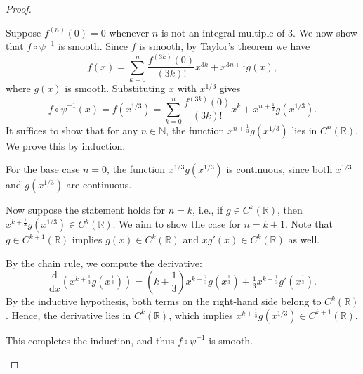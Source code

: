 \begin{problem}
\begin{proof}
\begin{enumerate}
            Suppose $f^{(n)}(0) = 0$ whenever $n$ is not an integral multiple of $3$. We now show that $f \circ \psi^{-1}$ is smooth. Since $f$ is smooth, by Taylor's theorem we have
            \[
            f(x) = \sum_{k=0}^{n} \frac{f^{(3k)}(0)}{(3k)!} x^{3k} + x^{3n+1} g(x),
            \]
            where $g(x)$ is smooth. Substituting $x$ with $x^{1/3}$ gives
            \[
            f \circ \psi^{-1}(x) = f(x^{1/3}) = \sum_{k=0}^{n} \frac{f^{(3k)}(0)}{(3k)!} x^{k} + x^{n + \frac{1}{3}} g(x^{1/3}).
            \]
            It suffices to show that for any $n \in \mathbb{N}$, the function $x^{n + \frac{1}{3}} g(x^{1/3})$ lies in $C^n(\mathbb{R})$. We prove this by induction.

            For the base case $n = 0$, the function $x^{1/3} g(x^{1/3})$ is continuous, since both $x^{1/3}$ and $g(x^{1/3})$ are continuous. 

            Now suppose the statement holds for $n = k$, i.e., if $g \in C^k(\mathbb{R})$, then $x^{k + \frac{1}{3}} g(x^{1/3}) \in C^k(\mathbb{R})$. We aim to show the case for $n = k + 1$. Note that $g \in C^{k+1}(\mathbb{R})$ implies $g(x) \in C^k(\mathbb{R})$ and $xg'(x) \in C^k(\mathbb{R})$ as well.

            By the chain rule, we compute the derivative:
            \[
            \frac{\mathrm{d}}{\mathrm{d}x}\left( x^{k + \frac{1}{3}} g(x^{\frac{1}{3}}) \right) 
            = \left(k + \frac{1}{3}\right) x^{k - \frac{2}{3}} g(x^{\frac{1}{3}}) + \tfrac{1}{3} x^{k - \frac{1}{3}} g'(x^{\frac{1}{3}}).
            \]
            By the inductive hypothesis, both terms on the right-hand side belong to $C^k(\mathbb{R})$. Hence, the derivative lies in $C^k(\mathbb{R})$, which implies $x^{k + \frac{1}{3}} g(x^{1/3}) \in C^{k+1}(\mathbb{R})$. 

            This completes the induction, and thus $f \circ \psi^{-1}$ is smooth.
        \end{enumerate}
    \end{proof}
\end{problem}

